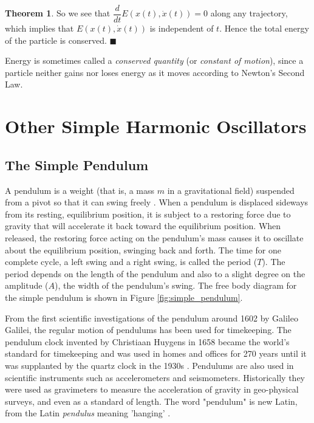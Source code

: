 \documentclass{article}
\theoremstyle{definition}
\newtheorem{theorem}{Theorem}[section]
\begin{document}
\begin{theorem}
\bigskip
\noindent
So we see that $\dfrac{d}{dt} E(x(t),\dot{x}(t)) = 0$ along any 
trajectory, which implies that $E(x(t), \dot{x}(t))$ is independent 
of $t$. Hence the total energy of the particle is conserved. 
$\blacksquare$
\end{theorem}

\noindent
Energy is sometimes called a \emph{conserved quantity} (or 
\emph{constant of motion}), since a particle neither gains 
nor loses energy as it moves according to Newton’s Second 
Law. 

\section{Other Simple Harmonic Oscillators}
\label{sec:smo}

\subsection{The Simple Pendulum}
\label{subsec:simple_pendulum}
A pendulum is a weight (that is, a mass $m$ in a gravitational
field) suspended from a pivot so that it can swing freely
\cite{wiki:pendulum}.  When a pendulum is displaced sideways from
its resting, equilibrium position, it is subject to a restoring
force due to gravity that will accelerate it back toward the
equilibrium position. When released, the restoring force acting
on the pendulum's mass causes it to oscillate about the
equilibrium position, swinging back and forth. The time for one
complete cycle, a left swing and a right swing, is called the
period ($T$). The period depends on the length of the pendulum
and also to a slight degree on the amplitude ($A$), the width of
the pendulum's swing. The free body diagram
\cite{wiki:free_body_diagram} for the simple pendulum is shown in
Figure \ref{fig:simple_pendulum}.


\bigskip
\noindent
From the first scientific investigations of the pendulum around
1602 by Galileo Galilei, the regular motion of pendulums has been used
for timekeeping. The pendulum clock invented by Christiaan Huygens in 
1658 became the world's standard for timekeeping \cite{wiki:huygens} 
and was used in homes and offices for 270 years until it was supplanted  
by the quartz clock in the 1930s \cite{quartz_crystal_clock}. 
Pendulums are also used in scientific instruments such 
as accelerometers and seismometers. Historically they were used as 
gravimeters to measure the acceleration of gravity in geo-physical 
surveys, and even as a standard of length. The word "pendulum" is 
new Latin, from the Latin \emph{pendulus} meaning 'hanging'
\cite{american_heritage_dictionary}.
\end{document}
